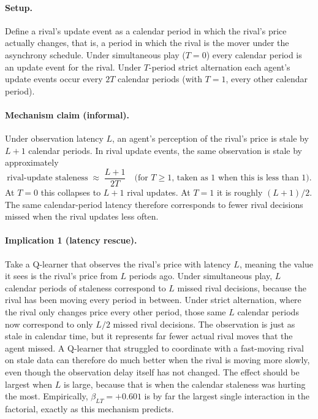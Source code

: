 \paragraph{Setup.} Define a rival's update event as a calendar period in which the rival's price actually changes, that is, a period in which the rival is the mover under the asynchrony schedule. Under simultaneous play ($T=0$) every calendar period is an update event for the rival. Under $T$-period strict alternation each agent's update events occur every $2T$ calendar periods (with $T=1$, every other calendar period).

\paragraph{Mechanism claim (informal).} Under observation latency $L$, an agent's perception of the rival's price is stale by $L+1$ calendar periods. In rival update events, the same observation is stale by approximately
\begin{equation*}
    \text{rival-update staleness} \;\approx\; \frac{L+1}{2T} \quad \text{(for $T\geq 1$, taken as 1 when this is less than 1).}
\end{equation*}
At $T=0$ this collapses to $L+1$ rival updates. At $T=1$ it is roughly $(L+1)/2$. The same calendar-period latency therefore corresponds to fewer rival decisions missed when the rival updates less often.

\paragraph{Implication 1 (latency rescue).} Take a Q-learner that observes the rival's price with latency $L$, meaning the value it sees is the rival's price from $L$ periods ago. Under simultaneous play, $L$ calendar periods of staleness correspond to $L$ missed rival decisions, because the rival has been moving every period in between. Under strict alternation, where the rival only changes price every other period, those same $L$ calendar periods now correspond to only $L/2$ missed rival decisions. The observation is just as stale in calendar time, but it represents far fewer actual rival moves that the agent missed. A Q-learner that struggled to coordinate with a fast-moving rival on stale data can therefore do much better when the rival is moving more slowly, even though the observation delay itself has not changed. The effect should be largest when $L$ is large, because that is when the calendar staleness was hurting the most. Empirically, $\beta_{LT} = +0.601$ is by far the largest single interaction in the factorial, exactly as this mechanism predicts.

